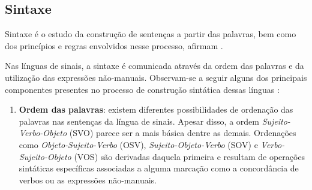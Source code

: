 \subsection{Sintaxe}
\label{sec:linguistica-sintaxe}

Sintaxe é o estudo da construção de sentenças a partir das palavras, bem como dos princípios e regras envolvidos nesse processo, afirmam .

Nas línguas de sinais, a sintaxe é comunicada através da ordem das palavras e da utilização das expressões não-manuais.
Observam-se a seguir alguns dos principais componentes presentes no processo de construção sintática dessas línguas \cite{jay-2011-dont-just-sign,hill-2019-sign-languages,quadros-2004-estudos-linguisticos}:

\begin{enumerate}
    \item \textbf{Ordem das palavras}: existem diferentes possibilidades de ordenação das palavras nas sentenças da língua de sinais. Apesar disso, a ordem \textit{Sujeito-Verbo-Objeto} (SVO) parece ser a mais básica dentre as demais.
          Ordenações como \textit{Objeto-Sujeito-Verbo} (OSV), \textit{Sujeito-Objeto-Verbo} (SOV) e \textit{Verbo-Sujeito-Objeto} (VOS) são derivadas daquela primeira e resultam de operações sintáticas específicas associadas a alguma marcação como a concordância de verbos ou as expressões não-manuais.








\end{enumerate}
